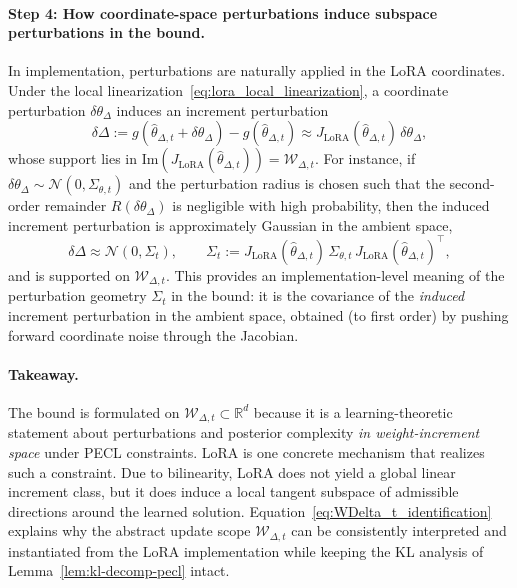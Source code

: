 \documentclass{article}
\theoremstyle{plain}
\theoremstyle{definition}
\theoremstyle{remark}
\begin{document}
\paragraph{Step 4: How coordinate-space perturbations induce subspace perturbations in the bound.}
In implementation, perturbations are naturally applied in the LoRA coordinates.
Under the local linearization~\eqref{eq:lora_local_linearization}, a coordinate perturbation
$\delta\theta_\Delta$ induces an increment perturbation
\[
\delta\Delta := g(\hat\theta_{\Delta,t}+\delta\theta_\Delta) - g(\hat\theta_{\Delta,t})
\approx
J_{\mathrm{LoRA}}(\hat\theta_{\Delta,t})\,\delta\theta_\Delta,
\]
whose support lies in $\mathrm{Im}(J_{\mathrm{LoRA}}(\hat\theta_{\Delta,t}))=\mathcal W_{\Delta,t}$.
For instance, if $\delta\theta_\Delta\sim\mathcal N(0,\Sigma_{\theta,t})$ and the perturbation radius
is chosen such that the second-order remainder $R(\delta\theta_\Delta)$ is negligible with high probability,
then the induced increment perturbation is approximately Gaussian in the ambient space,
\begin{equation}
\label{eq:Sigma_pushforward}
\delta\Delta \approx \mathcal N(0,\Sigma_t),
\qquad
\Sigma_t := J_{\mathrm{LoRA}}(\hat\theta_{\Delta,t})\,\Sigma_{\theta,t}\,
J_{\mathrm{LoRA}}(\hat\theta_{\Delta,t})^\top,
\end{equation}
and is supported on $\mathcal W_{\Delta,t}$.
This provides an implementation-level meaning of the perturbation geometry $\Sigma_t$ in the bound:
it is the covariance of the \emph{induced} increment perturbation in the ambient space,
obtained (to first order) by pushing forward coordinate noise through the Jacobian.

\paragraph{Takeaway.}
The bound is formulated on $\mathcal W_{\Delta,t}\subset\mathbb R^d$ because it is a learning-theoretic
statement about perturbations and posterior complexity \emph{in weight-increment space} under PECL constraints.
LoRA is one concrete mechanism that realizes such a constraint.
Due to bilinearity, LoRA does not yield a global linear increment class, but it does induce a local
tangent subspace of admissible directions around the learned solution.
Equation~\eqref{eq:WDelta_t_identification} explains why the abstract update scope $\mathcal W_{\Delta,t}$
can be consistently interpreted and instantiated from the LoRA implementation while keeping the KL analysis
of Lemma~\ref{lem:kl-decomp-pecl} intact.
\end{document}
